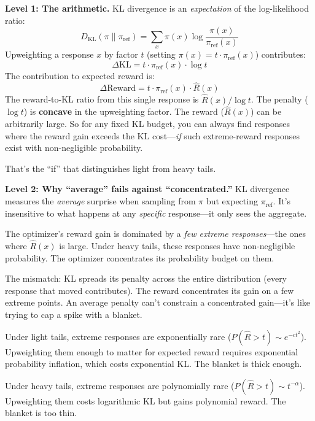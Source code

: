 \documentclass[11pt]{article}
\begin{document}
\textbf{Level 1: The arithmetic.} KL divergence is an \emph{expectation}
of the log-likelihood ratio:
\begin{equation}
  D_{\text{KL}}(\pi \| \pi_{\text{ref}}) = \sum_x \pi(x)
  \log\frac{\pi(x)}{\pi_{\text{ref}}(x)}
\end{equation}
Upweighting a response $x$ by factor $t$ (setting $\pi(x) = t \cdot
\pi_{\text{ref}}(x)$) contributes:
\begin{equation}
  \Delta \text{KL} = t \cdot \pi_{\text{ref}}(x) \cdot \log t
\end{equation}
The contribution to expected reward is:
\begin{equation}
  \Delta \text{Reward} = t \cdot \pi_{\text{ref}}(x) \cdot \hat{R}(x)
\end{equation}
The reward-to-KL ratio from this single response is
$\hat{R}(x) / \log t$. The penalty ($\log t$) is \textbf{concave} in
the upweighting factor. The reward ($\hat{R}(x)$) can be arbitrarily
large. So for any fixed KL budget, you can always find responses where
the reward gain exceeds the KL cost---\emph{if} such extreme-reward
responses exist with non-negligible probability.

That's the ``if'' that distinguishes light from heavy tails.

\textbf{Level 2: Why ``average'' fails against ``concentrated.''}
KL divergence measures the \emph{average} surprise when sampling from
$\pi$ but expecting $\pi_{\text{ref}}$. It's insensitive to what
happens at any \emph{specific} response---it only sees the aggregate.

The optimizer's reward gain is dominated by a \emph{few extreme
responses}---the ones where $\hat{R}(x)$ is large. Under heavy tails,
these responses have non-negligible probability. The optimizer
concentrates its probability budget on them.

The mismatch: KL spreads its penalty across the entire distribution
(every response that moved contributes). The reward concentrates its
gain on a few extreme points. An average penalty can't constrain a
concentrated gain---it's like trying to cap a spike with a blanket.

Under light tails, extreme responses are exponentially rare
($P(\hat{R} > t) \sim e^{-ct^2}$). Upweighting them enough to matter
for expected reward requires exponential probability inflation, which
costs exponential KL. The blanket is thick enough.

Under heavy tails, extreme responses are polynomially rare
($P(\hat{R} > t) \sim t^{-\alpha}$). Upweighting them costs logarithmic
KL but gains polynomial reward. The blanket is too thin.
\end{document}
